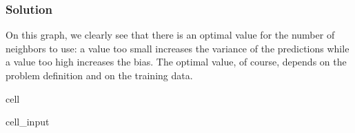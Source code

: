 \documentclass[letterpaper,10pt,english]{jupyterBook}
\begin{document}
\subsubsection{Solution}
\label{\detokenize{03:id1}}
\begin{sphinxShadowBox}
\sphinxstylesidebartitle{}

\sphinxAtStartPar
On this graph, we clearly see that there is an optimal value for the number of neighbors to use: a value too small increases the variance of the predictions while a value too high increases the bias. The optimal value, of course, depends on the problem definition and on the training data.
\end{sphinxShadowBox}

\begin{sphinxuseclass}{cell}\begin{sphinxVerbatimInput}

\begin{sphinxuseclass}{cell_input}
\begin{sphinxVerbatim}[commandchars=\\\{\}]
\PYG{p}{[} \PYG{p}{]}
 
 

 
         


\end{sphinxVerbatim}
\end{sphinxuseclass}
\end{sphinxVerbatimInput}
\end{sphinxuseclass}
\end{document}
